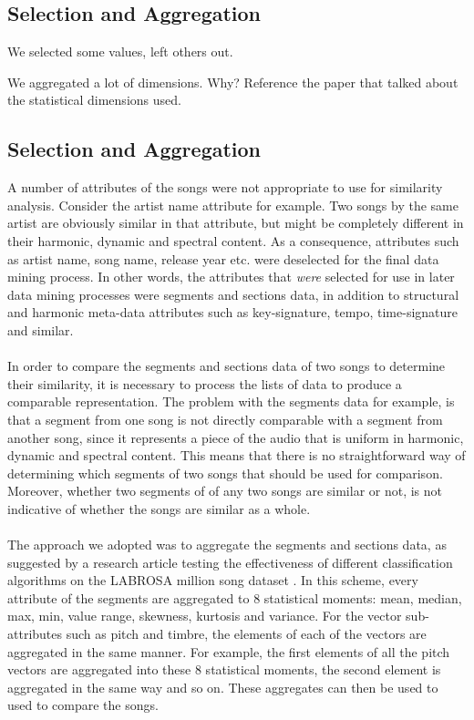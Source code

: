 
\subsection{Selection and Aggregation}
\label{sec:preprocessing_selection}
\label{sec:preprocessing_aggregation}

We selected some values, left others out.

We aggregated a lot of dimensions. Why? Reference the paper that talked about the statistical dimensions used.

\subsection{Selection and Aggregation}
\label{sec:preprocessing_selection}
A number of attributes of the songs were not appropriate to use for similarity analysis. Consider the artist name attribute for example. Two songs by the same artist are obviously similar in that attribute, but might be completely different in their harmonic, dynamic and spectral content. As a consequence, attributes such as artist name, song name, release year etc. were deselected for the final data mining process. In other words, the attributes that \textit{were} selected for use in later data mining processes were segments and sections data, in addition to structural and harmonic meta-data attributes such as key-signature, tempo, time-signature and similar.
\\\\
In order to compare the segments and sections data of two songs to determine their similarity, it is necessary to process the lists of data to produce a comparable representation. The problem with the segments data for example, is that a segment from one song is not directly comparable with a segment from another song, since it represents a piece of the audio that is uniform in harmonic, dynamic and spectral content. This means that there is no straightforward way of determining which segments of two songs that should be used for comparison. Moreover, whether two segments of of any two songs are similar or not, is not indicative of whether the songs are similar as a whole.
\\\\
The approach we adopted was to aggregate the segments and sections data, as suggested by a research article testing the effectiveness of different classification algorithms on the LABROSA million song dataset \citep{schindler12}. In this scheme, every attribute of the segments are aggregated to 8 statistical moments: mean, median, max, min, value range, skewness, kurtosis and variance. For the vector sub-attributes such as pitch and timbre, the elements of each of the vectors are aggregated in the same manner. For example, the first elements of all the pitch vectors are aggregated into these 8 statistical moments, the second element is aggregated in the same way and so on. These aggregates can then be used to used to compare the songs.

